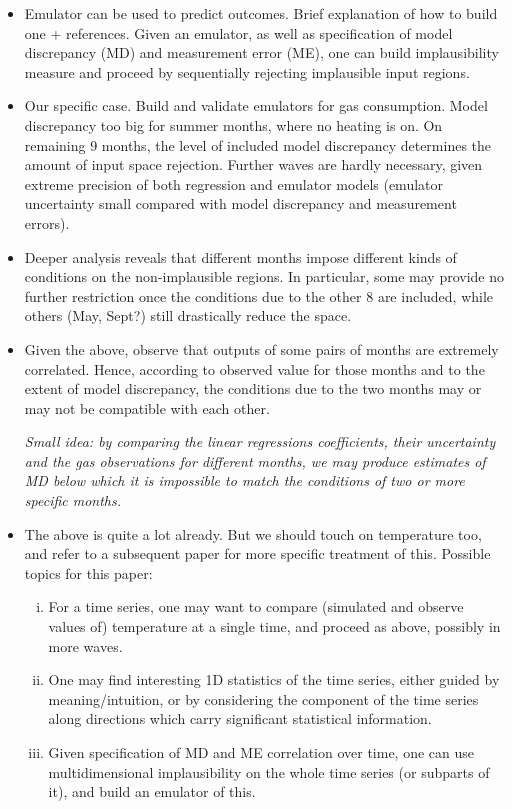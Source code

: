 \documentclass[a4paper, 12pt]{article}
\begin{document}
\begin{itemize}[leftmargin=*]
\item Emulator can be used to predict outcomes. Brief explanation of how to build one + references.
Given an emulator, as well as specification of model discrepancy (MD) and measurement error (ME), one can build implausibility measure and proceed by sequentially rejecting implausible input regions.

\item Our specific case. Build and validate emulators for gas consumption. Model discrepancy too big for summer months, where no heating is on. On remaining 9 months, the level of included model discrepancy determines the amount of input space rejection. Further waves are hardly necessary, given extreme precision of both regression and emulator models (emulator uncertainty small compared with model discrepancy and measurement errors).

\item Deeper analysis reveals that different months impose different kinds of conditions on the non-implausible regions. In particular, some may provide no further restriction once the conditions due to the other 8 are included, while others (May, Sept?) still drastically reduce the space.

\item Given the above, observe that outputs of some pairs of months are extremely correlated. Hence, according to observed value for those months and to the extent of model discrepancy, the conditions due to the two months may or may not be compatible with each other.

{\small \it Small idea: by comparing the linear regressions coefficients, their uncertainty and the gas observations for different months, we may produce estimates of MD below which it is impossible to match the conditions of two or more specific months.}

\item The above is quite a lot already. But we should touch on temperature too, and refer to a subsequent paper for more specific treatment of this. Possible topics for this paper:
\begin{enumerate}[i)]
\item For a time series, one may want to compare (simulated and observe values of) temperature at a single time, and proceed as above, possibly in more waves.
\item One may find interesting 1D statistics of the time series, either guided by meaning/intuition, or by considering the component of the time series along directions which carry significant statistical information.
\item Given specification of MD and ME correlation over time, one can use multidimensional implausibility on the whole time series (or subparts of it), and build an emulator of this.
\end{enumerate}


\end{itemize}
\end{document}
